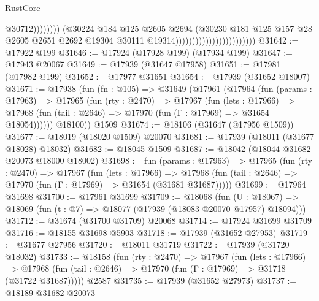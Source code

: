 \begin{lexlean}{RustCore}
\begin{coremodule}
                                                                @30712))))))))
                                                (@30224
                                                  @184
                                                  @125
                                                  @2605
                                                  @2694
                                                  (@30230
                                                    @181
                                                    @125
                                                    @157
                                                    @28
                                                    @2605
                                                    @2651
                                                    @2692
                                                    @19304
                                                    @30111
                                                    @19314))))))))))))))))))))))))
@31642 := @17922 @199
@31646 := @17924 (@17928 @199) (@17934 @199)
@31647 := @17943 @20067
@31649 := @17939 (@31647 @17958)
@31651 := @17981 (@17982 @199)
@31652 := @17977 @31651
@31654 := @17939 (@31652 @18007)
@31671 := @17938
    (fun (fn : @105) =>
    @31649
      (@17961
        (@17964
          (fun (params : @17963) =>
          @17965
            (fun (rty : @2470) =>
            @17967
              (fun (lets : @17966) =>
              @17968 (fun (tail : @2646) => @17970 (fun (Γ : @17969) => @31654 @18054))))))
        @18100))
    @1509
@31674 := @18106 (@31647 (@17956 @1509))
@31677 := @18019 (@18020 @1509) @20070
@31681 := @17939 (@18011 (@31677 @18028) @18032)
@31682 := @18045 @1509
@31687 := @18042 (@18044 @31682 @20073 @18000 @18002)
@31698 := fun (params : @17963) =>
  @17965
    (fun (rty : @2470) =>
    @17967
      (fun (lets : @17966) =>
      @17968 (fun (tail : @2646) => @17970 (fun (Γ : @17969) => @31654 (@31681 @31687)))))
@31699 := @17964 @31698
@31700 := @17961 @31699
@31709 := @18068
    (fun (U : @18067) => @18069 (fun (t : @7) => @18077 (@17939 (@18083 @20070 @17957) @18094)))
@31712 := @31674 (@31700 @31709) @20068
@31714 := @17924 @31699 @31709
@31716 := @18155 @31698 @5903
@31718 := @17939 (@31652 @27953)
@31719 := @31677 @27956
@31720 := @18011 @31719
@31722 := @17939 (@31720 @18032)
@31733 := @18158
    (fun (rty : @2470) =>
    @17967
      (fun (lets : @17966) =>
      @17968 (fun (tail : @2646) => @17970 (fun (Γ : @17969) => @31718 (@31722 @31687)))))
    @2587
@31735 := @17939 (@31652 @27973)
@31737 := @18189 @31682 @20073

\end{coremodule}
\end{lexlean}
